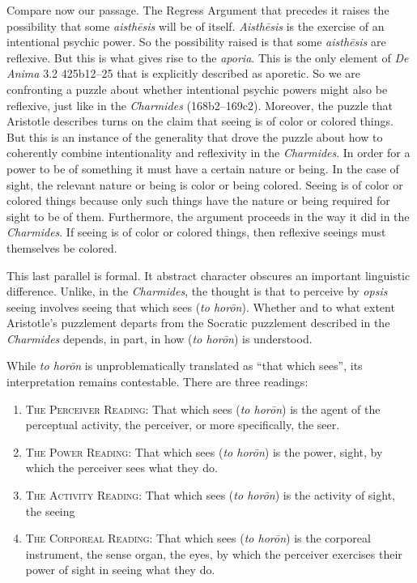 Compare now our passage. The Regress Argument that precedes it raises the possibility that some \emph{aisthēsis} will be of itself. \emph{Aisthēsis} is the exercise of an intentional psychic power. So the possibility raised is that some \emph{aisthēsis} are reflexive. But this is what gives rise to the \emph{aporia}. This is the only element of \emph{De Anima} 3.2 425b12–25 that is explicitly described as aporetic. So we are confronting a puzzle about whether intentional psychic powers might also be reflexive, just like in the \emph{Charmides} (168b2–169c2). Moreover, the puzzle that Aristotle describes turns on the claim that seeing is of color or colored things. But this is an instance of the generality that drove the puzzle about how to coherently combine intentionality and reflexivity in the \emph{Charmides}. In order for a power to be of something it must have a certain nature or being. In the case of sight, the relevant nature or being is color or being colored. Seeing is of color or colored things because only such things have the nature or being required for sight to be of them. Furthermore, the argument proceeds in the way it did in the \emph{Charmides}. If seeing is of color or colored things, then reflexive seeings must themselves be colored.

This last parallel is formal. It abstract character obscures an important linguistic difference. Unlike, in the \emph{Charmides}, the thought is that to perceive by \emph{opsis} seeing involves seeing that which sees (\emph{to horōn}). Whether and to what extent Aristotle's puzzlement departs from the Socratic puzzlement described in the \emph{Charmides} depends, in part, in how (\emph{to horōn}) is understood.

While \emph{to horōn} is unproblematically translated as ``that which sees'', its interpretation remains contestable. There are three readings:
\begin{enumerate}[(1)]
	\item \textsc{The Perceiver Reading}: That which sees (\emph{to horōn}) is the agent of the perceptual activity, the perceiver, or more specifically, the seer.
	\item \textsc{The Power Reading}: That which sees (\emph{to horōn}) is the power, sight, by which the perceiver sees what they do.
	\item \textsc{The Activity Reading}: That which sees (\emph{to horōn}) is the activity of sight, the seeing
	\item \textsc{The Corporeal Reading}: That which sees (\emph{to horōn}) is the corporeal instrument, the sense organ, the eyes, by which the perceiver exercises their power of sight in seeing what they do.
\end{enumerate}

